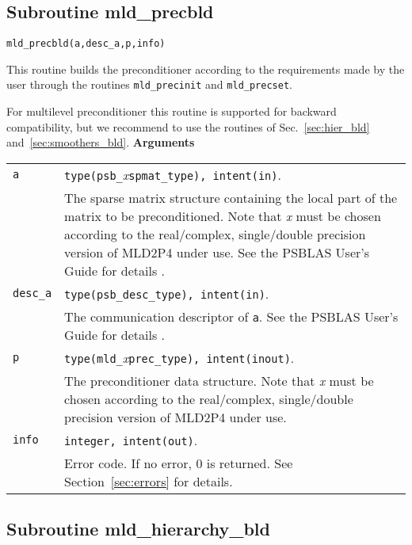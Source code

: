 \clearpage

\subsection{Subroutine mld\_precbld\label{sec:precbld}}
  
\begin{center}
\verb|mld_precbld(a,desc_a,p,info)|\\
\end{center}

\noindent
This routine builds the preconditioner according to the requirements made by
the user through the routines \verb|mld_precinit| and \verb|mld_precset|.

For multilevel preconditioner this routine is supported for backward
compatibility, but we recommend to use the routines of
Sec.~\ref{sec:hier_bld} and~\ref{sec:smoothers_bld}.
{\baselineskip\noindent\large\bfseries Arguments}

\begin{tabular}{p{1.2cm}p{12cm}}
\verb|a|      & \verb|type(psb_|\emph{x}\verb|spmat_type), intent(in)|. \\
              & The sparse matrix structure containing the local part of the
                matrix to be preconditioned. Note that \emph{x} must be chosen according
                to the real/complex, 
single/double precision version of MLD2P4 under use.
                See the PSBLAS User's Guide for details \cite{PSBLASGUIDE}.\\
\verb|desc_a| & \verb|type(psb_desc_type), intent(in)|. \\
              & The communication descriptor of \verb|a|. See the PSBLAS User's Guide for
                details \cite{PSBLASGUIDE}.\\
\verb|p|      & \verb|type(mld_|\emph{x}\verb|prec_type), intent(inout)|.\\
              & The preconditioner data structure. Note that \emph{x} must be chosen according
                to the real/complex, single/double precision version of MLD2P4 under use.\\
\verb|info|   & \verb|integer, intent(out)|.\\
              & Error code. If no error, 0 is returned. See Section~\ref{sec:errors} for details.\\
\end{tabular}

\subsection{Subroutine mld\_hierarchy\_bld\label{sec:hier_bld}}
  
